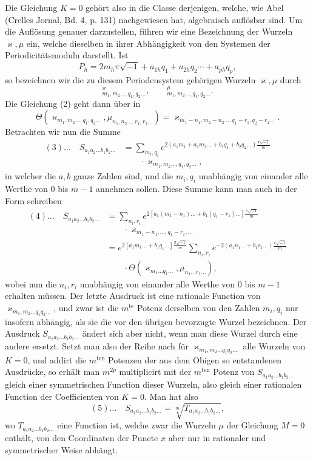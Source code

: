 \documentclass[10pt]{article}
\begin{document}
Die Gleichung \(K=0\) gehört also in die Classe derjenigen, welche, wie Abel (Crelles Jornal, Bd. 4, p. 131) nachgewiesen hat, algebraisch auflösbar sind. Um die Auflösung genauer darzustellen, führen wir eine Bezeichnung der Wurzeln \(\varkappa,\mu\) ein, welche dieselben in ihrer Abhängigkeit von den Systemen der Periodicitätsmoduln darstellt. Ist
\[
P_h=2m_h\pi\sqrt{-1}+a_{1h}q_1+a_{2h}q_2\cdots+a_{ph}q_p,
\]
so bezeichnen wir die zu diesem Periodensystem gehörigen Wurzeln \(\varkappa,\mu\) durch
\[
{}^{\varkappa}_{m_1,m_2\ldots,q_1,q_2\ldots},\qquad
{}^{\mu}_{m_1,m_2\ldots,q_1,q_2\ldots}.
\]
Die Gleichung (2) geht dann über in
\[
\Theta\!\left(
\varkappa_{m_1,m_2\ldots,q_1,q_2\ldots},
\mu_{n_1,n_2\ldots,r_1,r_2\ldots}
\right)
=
\varkappa_{m_1-n_1,m_2-n_2\ldots,q_1-r_1,q_2-r_2\ldots}.
\]
Betrachten wir nun die Summe
\[
\begin{aligned}
(3)\ldots\quad S_{a_1a_2\ldots b_1b_2\ldots}
&=\sum_{m_i,q_i}
e^{2(a_1m_1+a_2m_2\ldots+b_1q_1+b_2q_2\ldots)
\frac{\pi\sqrt{-1}}{m}}\\
&\qquad\cdot\varkappa_{m_1,m_2\ldots,q_1,q_2\ldots},
\end{aligned}
\]
in welcher die \(a,b\) ganze Zahlen sind, und die \(m_i,q_i\) unabhängig von einander alle Werthe von \(0\) bis \(m-1\) annehmen sollen. Diese Summe kann man auch in der Form schreiben
\[
\begin{aligned}
(4)\ldots\quad S_{a_1a_2\ldots b_1b_2\ldots}
&=\sum_{n_i,r_i}
e^{2\left[a_1(m_1-n_1)\ldots+b_1(q_1-r_1)\ldots\right]
\frac{\pi\sqrt{-1}}{m}}\\
&\qquad\cdot\varkappa_{m_1-n_1,\ldots,q_1-r_1,\ldots}\\
&=e^{2\left[a_1m_1\ldots+b_1q_1\ldots\right]\frac{\pi\sqrt{-1}}{m}}
\sum_{n_i,r_i}
e^{-2(a_1n_1\ldots+b_1r_1\ldots)\frac{\pi\sqrt{-1}}{m}}\\
&\qquad\cdot
\Theta\!\left(
\varkappa_{m_1\ldots q_1\ldots},
\mu_{n_1\ldots r_1\ldots}
\right),
\end{aligned}
\]
wobei nun die \(n_i,r_i\) unabhängig von einander alle Werthe von \(0\) bis \(m-1\) erhalten müssen. Der letzte Ausdruck ist eine rationale Function von \(\varkappa_{m_1,m_2\ldots q_1q_2\ldots}\), und zwar ist die \(m^{\text{te}}\) Potenz derselben von den Zahlen \(m_i,q_i\) nur insofern abhängig, als sie die vor den übrigen bevorzugte Wurzel bezeichnen. Der Ausdruck \(S_{a_1a_2\ldots b_1b_2\ldots}\) ändert sich aber nicht, wenn man diese Wurzel durch eine andere ersetzt. Setzt man also der Reihe nach für \(\varkappa_{m_1,m_2\ldots q_1q_2\ldots}\) alle Wurzeln von \(K=0\), und addirt die \(m^{\text{ten}}\) Potenzen der aus dem Obigen so entstandenen Ausdrücke, so erhält man \(m^{2p}\) multiplicirt mit der \(m^{\text{ten}}\) Potenz von \(S_{a_1a_2\ldots b_1b_2\ldots}\) gleich einer symmetrischen Function dieser Wurzeln, also gleich einer rationalen Function der Coefficienten von \(K=0\). Man hat also
\[
(5)\ldots\quad
S_{a_1a_2\ldots b_1b_2\ldots}
=
\sqrt[m]{T_{a_1a_2\ldots b_1b_2\ldots}},
\]
wo \(T_{a_1a_2\ldots b_1b_2\ldots}\) eine Function ist, welche zwar die Wurzeln \(\mu\) der Gleichung \(M=0\) enthält, von den Coordinaten der Puncte \(x\) aber nur in rationaler und symmetrischer Weise abhängt.
\end{document}
